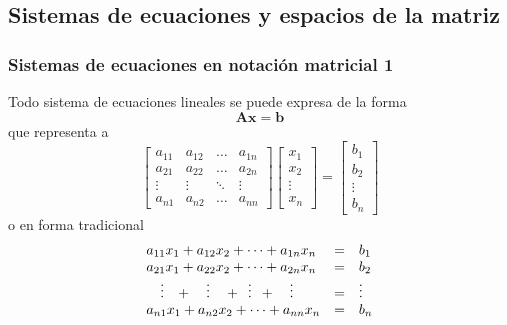 \documentclass{beamer}
\begin{document}
\subsection{Sistemas de ecuaciones y espacios de la matriz}
\begin{frame}
\frametitle{Sistemas de ecuaciones en notación matricial 1}
Todo sistema de ecuaciones lineales se puede expresa de la forma 
\begin{equation*}
\boldsymbol{A}\boldsymbol{x}= \boldsymbol{b}
\end{equation*}
que representa a 
\begin{equation*}
 \begin{bmatrix} a_{11} &  a_{12} & \dots & a_{1n}\\ a_{21} &  a_{22} & \dots & a_{2n} \\ \vdots &  \vdots & \ddots & \vdots \\ a_{n1} &  a_{n2} & \dots & a_{nn} \end{bmatrix}  \begin{bmatrix} x_1 \\ x_2 \\ \vdots \\ x_n \end{bmatrix} =\begin{bmatrix} b_1 \\ b_2 \\ \vdots \\ b_n \end{bmatrix}
\end{equation*}
o en forma tradicional 
\begin{equation*}
\begin{array}{lcl} a_{11}x_{1} +  a_{12}x_{2} +  \cdots + a_{1n}x_{n} & = & b_1 \\ a_{21}x_{1} +  a_{22}x_{2} +  \cdots + a_{2n}x_{n} & = & b_2 \\ \hspace{1em} \vdots \hspace{0.8em} +  \hspace{1em}  \vdots \hspace{1em} + \hspace{0.5em}\vdots \hspace{0.5em}+ \hspace{1em}\vdots \hspace{1em}& =&  \vdots\\  a_{n1}x_{1} +  a_{n2}x_{2} +  \cdots + a_{nn}x_{n} & = & b_n \end{array}
\end{equation*}
\end{frame}
\end{document}
